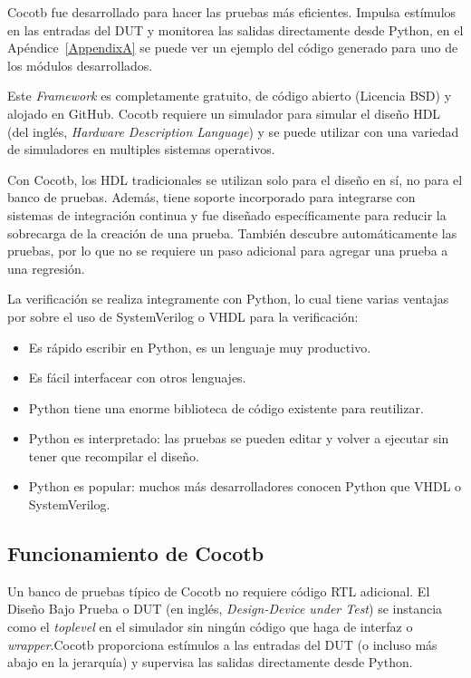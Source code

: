   Cocotb fue desarrollado para hacer las pruebas más eficientes. Impulsa
  estímulos en las entradas del DUT y monitorea las salidas directamente
  desde Python, en el Apéndice~\ref{AppendixA} se puede ver un ejemplo del
  código generado para uno de los módulos desarrollados.

  Este \textit{Framework} es completamente gratuito, de código abierto (Licencia
  BSD) y alojado en GitHub. Cocotb requiere un simulador para simular el
  diseño HDL (del inglés, \textit{Hardware Description Language}) y
  se puede utilizar con una variedad de simuladores en multiples sistemas
  operativos.


  Con Cocotb, los HDL tradicionales se utilizan solo para el diseño en
  sí, no para el banco de pruebas. Además, tiene soporte incorporado para
  integrarse con sistemas de integración continua y fue diseñado específicamente
  para reducir la sobrecarga de la creación de una prueba. También descubre
  automáticamente las pruebas, por lo que no se requiere un paso adicional para
  agregar una prueba a una regresión.

  La verificación se realiza integramente con Python, lo cual tiene varias
  ventajas por sobre el uso de SystemVerilog o VHDL para la verificación:

\begin{itemize}
  \item Es rápido escribir en Python, es un lenguaje muy productivo.
  \item Es fácil interfacear con otros lenguajes.
  \item Python tiene una enorme biblioteca de código existente para reutilizar.
  \item Python es interpretado: las pruebas se pueden editar y volver a ejecutar
  sin tener que recompilar el diseño.
  \item Python es popular: muchos más desarrolladores conocen Python que
  VHDL o SystemVerilog.
\end{itemize}

\subsection{Funcionamiento de Cocotb}

  Un banco de pruebas típico de Cocotb no requiere código RTL adicional.
  El Diseño Bajo Prueba o DUT (en inglés, \textit{Design-Device
  under Test}) se instancia como el \textit{toplevel} en el simulador sin ningún
  código que haga de interfaz o \textit{wrapper}.Cocotb proporciona
  estímulos a las entradas del DUT (o incluso más abajo en la jerarquía) y
  supervisa las salidas directamente desde Python.




